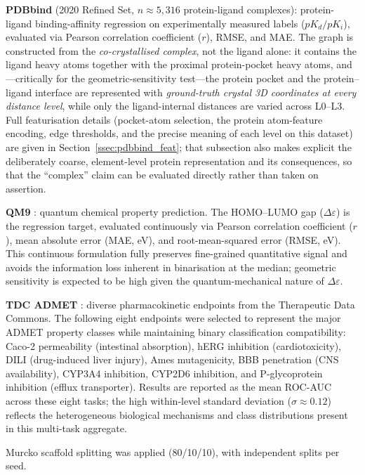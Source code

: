 \documentclass[pdflatex,sn-vancouver-num]{sn-jnl}%
\theoremstyle{thmstyleone}%
\theoremstyle{thmstyletwo}%
\theoremstyle{thmstylethree}%
\begin{document}
\textbf{PDBbind} \cite{liu2015pdbbind} (2020 Refined Set, $n \approx 5{,}316$ protein-ligand complexes): protein-ligand binding-affinity regression on experimentally measured labels ($pK_d/pK_i$), evaluated via Pearson correlation coefficient ($r$), RMSE, and MAE.  The graph is constructed from the \emph{co-crystallised complex}, not the ligand alone: it contains the ligand heavy atoms together with the proximal protein-pocket heavy atoms, and---critically for the geometric-sensitivity test---the protein pocket and the protein--ligand interface are represented with \emph{ground-truth crystal 3D coordinates at every distance level}, while only the ligand-internal distances are varied across L0--L3.  Full featurisation details (pocket-atom selection, the protein atom-feature encoding, edge thresholds, and the precise meaning of each level on this dataset) are given in Section~\ref{ssec:pdbbind_feat}; that subsection also makes explicit the deliberately coarse, element-level protein representation and its consequences, so that the ``complex'' claim can be evaluated directly rather than taken on assertion.

\textbf{QM9} \cite{ramakrishnan2014qm9}: quantum chemical property
prediction.  The HOMO--LUMO gap ($\Delta\varepsilon$) is the regression
target, evaluated continuously via Pearson correlation coefficient ($r$),
mean absolute error (MAE, eV), and root-mean-squared error (RMSE, eV).
This continuous formulation fully preserves fine-grained quantitative signal and avoids
the information loss inherent in binarisation at the median; geometric sensitivity is
expected to be high given the quantum-mechanical nature of $\Delta\varepsilon$.

\textbf{TDC ADMET} \cite{huang2021tdc}: diverse pharmacokinetic endpoints
from the Therapeutic Data Commons.  The following eight endpoints were
selected to represent the major ADMET property classes while maintaining
binary classification compatibility: Caco-2 permeability (intestinal
absorption), hERG inhibition (cardiotoxicity), DILI (drug-induced liver
injury), Ames mutagenicity, BBB penetration (CNS availability), CYP3A4
inhibition, CYP2D6 inhibition, and P-glycoprotein inhibition (efflux transporter).  Results
are reported as the mean ROC-AUC across these eight tasks; the high
within-level standard deviation ($\sigma \approx 0.12$) reflects the heterogeneous
biological mechanisms and class distributions present in this multi-task
aggregate.

Murcko scaffold splitting \cite{bemis1996scaffolds} was applied (80/10/10),
with independent splits per seed.
\end{document}
